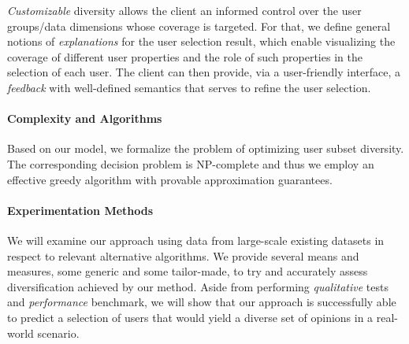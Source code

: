 \emph{Customizable} diversity allows the client an informed control over the user groups/data dimensions whose coverage is targeted. For that, we define general notions of  \emph{explanations} for the user selection result, which enable visualizing the coverage of different user properties and the role of such properties in the selection of each user. The client can then provide, via a user-friendly interface, a \emph{feedback} with well-defined semantics that serves to refine the user selection.     %



\paragraph*{Complexity and Algorithms} Based on our model, we formalize the problem of optimizing user subset diversity. The corresponding decision problem is NP-complete and thus we employ an effective greedy algorithm with provable approximation guarantees.  








\paragraph*{Experimentation Methods} We will examine our approach using data from large-scale existing datasets in respect to relevant alternative algorithms. We provide several means and measures, some generic and some tailor-made, to try and accurately assess diversification achieved by our method. Aside from performing \emph{qualitative} tests and \emph{performance} benchmark, we will show that our approach is successfully able to predict a selection of users that would yield a diverse set of opinions in a real-world scenario.

